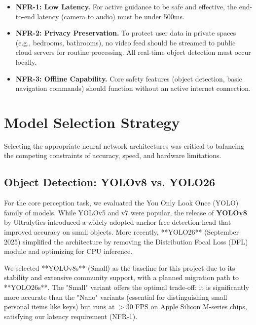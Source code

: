 \documentclass[12pt,a4paper]{report}
\begin{document}
\begin{itemize}
    \item \textbf{NFR-1: Low Latency.} For active guidance to be safe and effective, the end-to-end latency (camera to audio) must be under 500ms.
    \item \textbf{NFR-2: Privacy Preservation.} To protect user data in private spaces (e.g., bedrooms, bathrooms), no video feed should be streamed to public cloud servers for routine processing. All real-time object detection must occur locally.
    \item \textbf{NFR-3: Offline Capability.} Core safety features (object detection, basic navigation commands) should function without an active internet connection.
\end{itemize}

\section{Model Selection Strategy}

Selecting the appropriate neural network architectures was critical to balancing the competing constraints of accuracy, speed, and hardware limitations.

\subsection{Object Detection: YOLOv8 vs. YOLO26}
For the core perception task, we evaluated the You Only Look Once (YOLO) family of models. While YOLOv5 and v7 were popular, the release of \textbf{YOLOv8} by Ultralytics introduced a widely adopted anchor-free detection head that improved accuracy on small objects. More recently, **YOLO26** (September 2025) simplified the architecture by removing the Distribution Focal Loss (DFL) module and optimizing for CPU inference.

We selected **YOLOv8s** (Small) as the baseline for this project due to its stability and extensive community support, with a planned migration path to **YOLO26s**. The "Small" variant offers the optimal trade-off: it is significantly more accurate than the "Nano" variants (essential for distinguishing small personal items like keys) but runs at $>$30 FPS on Apple Silicon M-series chips, satisfying our latency requirement (NFR-1).
\end{document}
